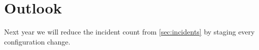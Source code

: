 \chapter{Outlook}
\label{ch:outlook}

Next year we will reduce the incident count from \cref{sec:incidents} by staging every configuration change.
